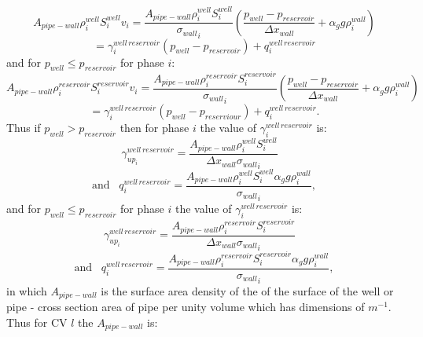 \begin{equation}
A_{pipe-wall} \rho_i^{well} S_i^{well} v_i = \frac{A_{pipe-wall} \rho_i^{well} S_i^{well} }{{\sigma_{wall}}_i} 
\left( \frac{ p_{well} - p_{reservoir} }{{\Delta x}_{wall}}  +\alpha_g g \rho_i^{wall}  \right)
\end{equation}
\begin{equation}
=\gamma_i^{well\, reservoir} (p_{well} - p_{reservoir}) + q_i^{well\, reservoir}
\label{saturation_wells_9}
\end{equation}
and for $p_{well}\leq p_{reservoir}$ for phase $i$: 
\begin{equation}
A_{pipe-wall}  \rho_i^{reservoir} S_i^{reservoir} v_i = \frac{A_{pipe-wall}  \rho_i^{reservoir} S_i^{reservoir} }{{\sigma_{wall}}_i} \left(\frac{ p_{well} - p_{reservoir} }{{\Delta x}_{wall}} +\alpha_g g \rho_i^{wall}\right)
\end{equation}
\begin{equation}
=\gamma_i^{well\, reservoir} (p_{well} - p_{reserviour}) + q_i^{well\, reservoir}. 
\label{saturation_wells_10}
\end{equation}
Thus if $p_{well}>p_{reservoir}$ then for phase $i$ the value of $\gamma_i^{well\, reservoir}$ is: 
\begin{equation}
\gamma_{up_i}^{well\, reservoir}=\frac{A_{pipe-wall}  \rho_i^{well} S_i^{well} }{{{\Delta x}_{wall}\sigma_{wall}}_i} 
\;\;\;
\end{equation}
\begin{equation}
\text{and} 
\;\;\;
q_{i}^{well\, reservoir}=\frac{A_{pipe-wall}  \rho_i^{well} S_i^{well} \alpha_g g \rho_i^{wall}    }
{{\sigma_{wall}}_i} ,
\label{saturation_wells_11}
\end{equation}
and for $p_{well}\leq p_{reservoir}$ for phase $i$ the value of $\gamma_i^{well\, reservoir}$ is:
\begin{equation}
\gamma_{up_i}^{well\, reservoir}=\frac{A_{pipe-wall}  \rho_i^{reservoir} S_i^{reservoir}   }
{{\Delta x}_{wall}{\sigma_{wall}}_i} 
\;\;\;
\end{equation}
\begin{equation}
\text{and} 
\;\;\;
q_{i}^{well\, reservoir}=\frac{A_{pipe-wall}  \rho_i^{reservoir} S_i^{reservoir} \alpha_g g \rho_i^{wall}}
{{\sigma_{wall}}_i} ,
\label{saturation_wells_12}
\end{equation}
in which $A_{pipe-wall}$ is the surface area density of the of the surface of the well or pipe - cross section area of pipe per unity volume which has dimensions of $m^{-1}$. Thus for CV $l$ the $A_{pipe-wall}$ is:
